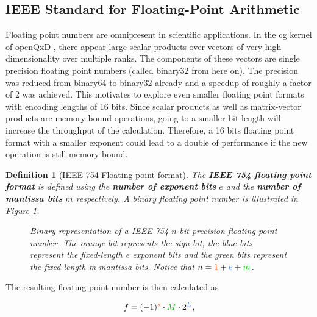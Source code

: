 \documentclass{article}
\theoremstyle{plain} %
\newtheorem{definition}{Definition}[section]
\theoremstyle{convention} %
\theoremstyle{remark} %
\def\df#1{\textbf{\textit{#1}}}
\numberwithin{equation}{section}
\begin{document}
\subsection{IEEE Standard for Floating-Point Arithmetic}

Floating point numbers are omnipresent in scientific applications. In the \acrfull{cg} kernel of openQxD \cite{openqxd}, there appear large scalar products over vectors of very high dimensionality over multiple ranks. The components of these vectors are single precision floating point numbers (called \gls{binary32} from here on). The precision was reduced from \gls{binary64} to \gls{binary32} already and a speedup of roughly a factor of 2 was achieved. This motivates to explore even smaller floating point formats with encoding lengths of 16 bits. Since scalar products as well as matrix-vector products are memory-bound operations, going to a smaller bit-length will increase the throughput of the calculation. Therefore, a 16 bits floating point format with a smaller exponent could lead to a double of performance if the new operation is still memory-bound.

\begin{definition}[IEEE 754 Floating point format]

The \df{IEEE 754 floating point format} \cite{ieee754_1985} is defined using the \df{number of exponent bits} $e$ and the \df{number of mantissa bits} $m$ respectively. A binary floating point number is illustrated in Figure \ref{fig:float}.

\begin{figure}[H]
  \caption{Binary representation of a IEEE 754 $n$-bit precision floating-point number. The \textcolor{corange}{orange} bit represents the \textcolor{corange}{sign bit}, the \textcolor{cblue}{blue} bits represent the fixed-length \textcolor{cblue}{e exponent bits} and the \textcolor{cgreen}{green} bits represent the fixed-length \textcolor{cgreen}{m mantissa bits}. Notice that $n = \textcolor{corange}{1} + \textcolor{cblue}{e} + \textcolor{cgreen}{m}$.}
  \label{fig:float}
\end{figure}

\end{definition}

The resulting floating point number is then calculated as

\begin{align*}
    f = (-1)^{\textcolor{corange}{s}} \cdot \textcolor{cgreen}{M} \cdot 2^{\textcolor{cblue}{E}},
\end{align*}
\end{document}
